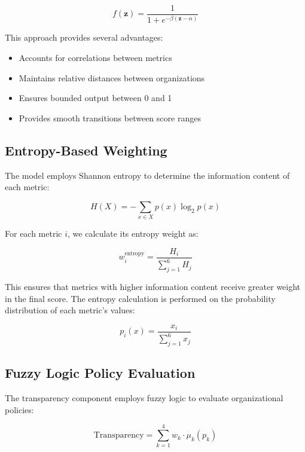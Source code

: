 \documentclass[12pt]{article}
\begin{document}
\begin{equation}
    f(\bm{z}) = \frac{1}{1 + e^{-\beta(\bm{z} - \alpha)}}
\end{equation}

This approach provides several advantages:
\begin{itemize}
    \item Accounts for correlations between metrics
    \item Maintains relative distances between organizations
    \item Ensures bounded output between 0 and 1
    \item Provides smooth transitions between score ranges
\end{itemize}

\subsection{Entropy-Based Weighting}

The model employs Shannon entropy to determine the information content of each metric:

\begin{equation}
    H(X) = -\sum_{x \in X} p(x) \log_2 p(x)
\end{equation}

For each metric $i$, we calculate its entropy weight as:

\begin{equation}
    w_i^{\text{entropy}} = \frac{H_i}{\sum_{j=1}^{6} H_j}
\end{equation}

This ensures that metrics with higher information content receive greater weight in the final score. The entropy calculation is performed on the probability distribution of each metric's values:

\begin{equation}
    p_i(x) = \frac{x_i}{\sum_{j=1}^{6} x_j}
\end{equation}

\subsection{Fuzzy Logic Policy Evaluation}

The transparency component employs fuzzy logic to evaluate organizational policies:

\begin{equation}
    \text{Transparency} = \sum_{k=1}^{4} w_k \cdot \mu_k(p_k)
\end{equation}
\end{document}
